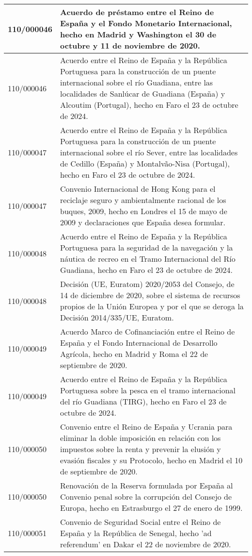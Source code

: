 {\begin{table}[H]
\begin{center}
\begin{tabularx}{\linewidth}{| l | X |}
\hline
110/000046 & Acuerdo de préstamo entre el Reino de España y el Fondo Monetario Internacional, hecho en Madrid y Washington el 30 de octubre y 11 de noviembre de 2020. \\
\hline
110/000046 & Acuerdo entre el Reino de España y la República Portuguesa para la construcción de un puente internacional sobre el río Guadiana, entre las localidades de Sanlúcar de Guadiana (España) y Alcoutim (Portugal), hecho en Faro el 23 de octubre de 2024. \\
\hline
110/000047 & Acuerdo entre el Reino de España y la República Portuguesa para la construcción de un puente internacional sobre el río Sever, entre las localidades de Cedillo (España) y Montalvão-Nisa (Portugal), hecho en Faro el 23 de octubre de 2024. \\
\hline
110/000047 & Convenio Internacional de Hong Kong para el reciclaje seguro y ambientalmente racional de los buques, 2009, hecho en Londres el 15 de mayo de 2009 y declaraciones que España desea formular. \\
\hline
110/000048 & Acuerdo entre el Reino de España y la República Portuguesa para la seguridad de la navegación y la náutica de recreo en el Tramo Internacional del Río Guadiana, hecho en Faro el 23 de octubre de 2024. \\
\hline
110/000048 & Decisión (UE, Euratom) 2020/2053 del Consejo, de 14 de diciembre de 2020, sobre el sistema de recursos propios de la Unión Europea y por el que se deroga la Decisión 2014/335/UE, Euratom. \\
\hline
110/000049 & Acuerdo Marco de Cofinanciación entre el Reino de España y el Fondo Internacional de Desarrollo Agrícola, hecho en Madrid y Roma el 22 de septiembre de 2020. \\
\hline
110/000049 & Acuerdo entre el Reino de España y la República Portuguesa sobre la pesca en el tramo internacional del río Guadiana (TIRG), hecho en Faro el 23 de octubre de 2024. \\
\hline
110/000050 & Convenio entre el Reino de España y Ucrania para eliminar la doble imposición en relación con los impuestos sobre la renta y prevenir la elusión y evasión fiscales y su Protocolo, hecho en Madrid el 10 de septiembre de 2020. \\
\hline
110/000050 & Renovación de la Reserva formulada por España al Convenio penal sobre la corrupción del Consejo de Europa, hecho en Estrasburgo el 27 de enero de 1999. \\
\hline
110/000051 & Convenio de Seguridad Social entre el Reino de España y la República de Senegal, hecho 'ad referendum' en Dakar el 22 de noviembre de 2020. \\

\end{tabularx}
\end{center}
\end{table}}

